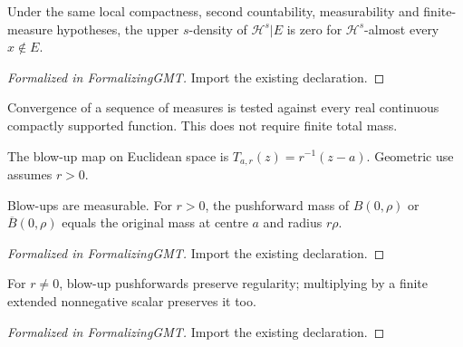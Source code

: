\begin{theorem}
\label{gmt:hausdorff-density-outside}
\leanok
{}
Under the same local compactness, second countability, measurability and finite-measure hypotheses, the upper $s$-density of $\mathcal H^s|E$ is zero for $\mathcal H^s$-almost every $x\notin E$.
\end{theorem}
\begin{proof}[Formalized in FormalizingGMT]
\leanok
{}
Import the existing declaration.
\end{proof}

\begin{definition}
\label{gmt:vague}
\leanok
Convergence of a sequence of measures is tested against every real continuous compactly supported function. This does not require finite total mass.
\end{definition}

\begin{definition}
\label{gmt:blowup}
\leanok
The blow-up map on Euclidean space is $T_{a,r}(z)=r^{-1}(z-a)$. Geometric use assumes $r>0$.
\end{definition}

\begin{lemma}
\label{gmt:blowup-balls}
\leanok
{}
Blow-ups are measurable. For $r>0$, the pushforward mass of $B(0,\rho)$ or $\overline B(0,\rho)$ equals the original mass at centre $a$ and radius $r\rho$.
\end{lemma}
\begin{proof}[Formalized in FormalizingGMT]
\leanok
Import the existing declaration.
\end{proof}

\begin{lemma}
\label{gmt:blowup-regular}
\leanok
{}
For $r\ne0$, blow-up pushforwards preserve regularity; multiplying by a finite extended nonnegative scalar preserves it too.
\end{lemma}
\begin{proof}[Formalized in FormalizingGMT]
\leanok
Import the existing declaration.
\end{proof}

